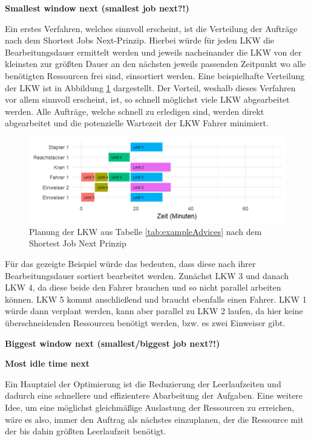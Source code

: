 \textbf{Smallest window next (smallest job next?!)} 

Ein erstes Verfahren, welches sinnvoll erscheint, ist die Verteilung der Aufträge nach dem \glqq{}Shortest Jobs Next\grqq{}-Prinzip. Hierbei würde für jeden LKW die Bearbeitungsdauer ermittelt werden und jeweils nacheinander die LKW von der kleinsten zur größten Dauer an den nächsten jeweils passenden Zeitpunkt wo alle benötigten Ressourcen frei sind, einsortiert werden. Eine beispielhafte Verteilung der LKW ist in Abbildung \ref{fig:rsSjnExample} dargestellt. Der Vorteil, weshalb dieses Verfahren vor allem sinnvoll erscheint, ist, so schnell möglichst viele LKW abgearbeitet werden. Alle Aufträge, welche schnell zu erledigen sind, werden direkt abgearbeitet und die potenzielle Wartezeit der LKW Fahrer minimiert.

\begin{figure}[H]
    \centering
    \includegraphics[width=\textwidth]{images/timelines/rsShortestJobNextExample.png}
    \caption{Planung der LKW aus Tabelle \ref{tab:exampleAdvices} nach dem Shortest Job Next Prinzip}
    \label{fig:rsSjnExample}
\end{figure}

Für das gezeigte Beispiel würde das bedeuten, dass diese nach ihrer Bearbeitungsdauer sortiert bearbeitet werden. Zunächst LKW 3 und danach LKW 4, da diese beide den Fahrer brauchen und so nicht parallel arbeiten können. LKW 5 kommt anschließend und braucht ebenfalls einen Fahrer. LKW 1 würde dann verplant werden, kann aber parallel zu LKW 2 laufen, da hier keine überschneidenden Ressourcen benötigt werden, bzw. es zwei Einweiser gibt.


\textbf{Biggest window next (smallest/biggest job next?!)}

\textbf{Most idle time next}

Ein Hauptziel der Optimierung ist die Reduzierung der Leerlaufzeiten und dadurch eine schnellere und effizientere Abarbeitung der Aufgaben. Eine weitere Idee, um eine möglichst gleichmäßige Auslastung der Ressourcen zu erreichen, wäre es also, immer den Auftrag als nächstes einzuplanen, der die Ressource mit der bis dahin größten Leerlaufzeit benötigt.

